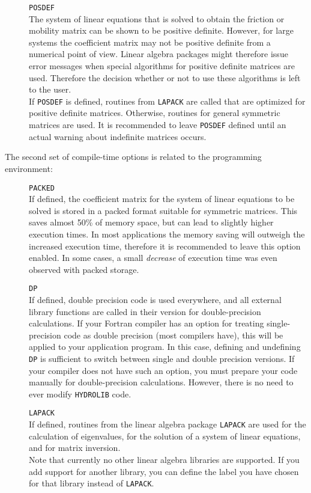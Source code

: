 \documentclass[12pt]{article}
\newcommand{\prog}[1]{{\tt #1}}
\begin{document}
\begin{description}
\item[]
\prog{POSDEF}\\
The system of linear equations that is solved to obtain the friction
or mobility matrix can be shown to be positive definite. However, for
large systems the coefficient matrix may not be positive definite from
a numerical point of view. Linear algebra packages might therefore
issue error messages when special algorithms for positive definite
matrices are used.  Therefore the decision whether or not to use these
algorithms is left to the user.\\ If \prog{POSDEF} is defined,
routines from \prog{LAPACK} are called that are optimized for positive
definite matrices. Otherwise, routines for general symmetric matrices
are used.  It is recommended to leave \prog{POSDEF} defined until an
actual warning about indefinite matrices occurs.\\

\end{description}

The second set of compile-time options is related to the programming
environment:

\begin{description}

\item[]
\prog{PACKED}\\
If defined, the coefficient matrix for the system of linear equations
to be solved is stored in a packed format suitable for symmetric
matrices. This saves almost 50\% of memory space, but can lead to
slightly higher execution times. In most applications the memory
saving will outweigh the increased execution time, therefore it is
recommended to leave this option enabled. In some cases, a
small {\em decrease} of execution time was even observed with packed
storage.

\item[]
\prog{DP}\\
If defined, double precision code is used everywhere, and all external
library functions are called in their version for double-precision
calculations. If your Fortran compiler has an option for treating
single-precision code as double precision (most compilers have), this
will be applied to your application program.  In this case, defining
and undefining \prog{DP} is sufficient to switch between single and
double precision versions. If your compiler does not have such an
option, you must prepare your code manually for double-precision
calculations. However, there is no need to ever modify \prog{HYDROLIB}
code.

\item[]
\prog{LAPACK}\\
If defined, routines from the linear algebra package \prog{LAPACK} are
used for the calculation of eigenvalues, for the solution of a system
of linear equations, and for matrix inversion.\\
Note that currently no other linear algebra libraries are
supported. If you add support for another library, you can
define the label you have chosen for that library instead
of \prog{LAPACK}.

\end{description}
\end{document}
